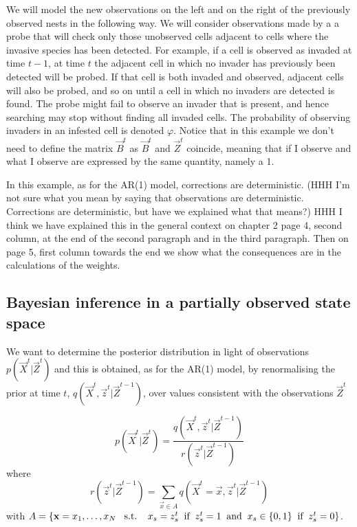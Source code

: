 We will model the new observations on the left and on the right of the previously observed nests {\color{blue} in the following way}. We will consider observations made by a a probe that will check only those unobserved cells adjacent to cells where the invasive species has been detected. For example, if a cell is observed as invaded at time $t-1$, at time $t$ the adjacent cell in which no invader has previously been detected will be probed. If that cell is both invaded and observed, adjacent cells will also be probed, and so on until a cell in which no invaders are detected is found. The probe might fail to observe an invader that is present, and hence searching may stop without finding all invaded cells. The probability of observing invaders in an infested cell is denoted $\varphi$. Notice that in this example we don't need to define the matrix $\vec{B}^t$ as $\vec{B}^t$ and $\vec{Z}^t$ coincide, meaning that if I observe and what I observe are expressed by the same quantity, namely a 1.

In this example, as for the AR(1) model, {\color{blue} corrections} are deterministic. {\color{red} (HHH I'm not sure what you mean by saying that observations are deterministic. Corrections are deterministic, but have we explained what that means?)} {\color{blue} HHH I think we have explained this in the general context on chapter 2 page 4, second column, at the end of the second paragraph and in the third paragraph. Then on page 5, first column towards the end we show what the consequences are in the calculations of the weights.}

\subsection{Bayesian inference in a partially observed state space}
\label{sec:8}

We want to determine the posterior distribution in light of observations $p(\vec{X}^{t} | \vec{Z}^{t})$ and this is obtained, as for the AR(1) model, by renormalising the prior at time $t$, $q(\vec{X}^{t}, \vec{z}^{t} | \vec{Z}^{t-1})$, over values consistent with the observations $\vec{Z}^{t}$

\begin{equation*}
    p(\vec{X}^{t} | \vec{Z}^{t})  =  \frac{q(\vec{X}^{t}, \vec{z}^{t} | \vec{Z}^{t-1})}{r(\vec{z}^{t} | \vec{Z}^{t-1})}
\end{equation*}
where {\color{blue}
\begin{equation*}
    r(\vec{z}^{t} | \vec{Z}^{t-1}) = \sum_{\vec{x}\in A} q(\vec{X}^{t} = \vec{x}, \vec{z}^{t} | \vec{Z}^{t-1})
\end{equation*}
with $A = \{ \vec{x} = x_1, \dots, x_N \; \text{\: s.t. \: } x_s = z_s^t \text{\: if \:} z_s^t = 1 \text{\: and \:} x_s \in \{ 0,1 \} \text{\: if \:} z_s^t = 0 \}$}.

